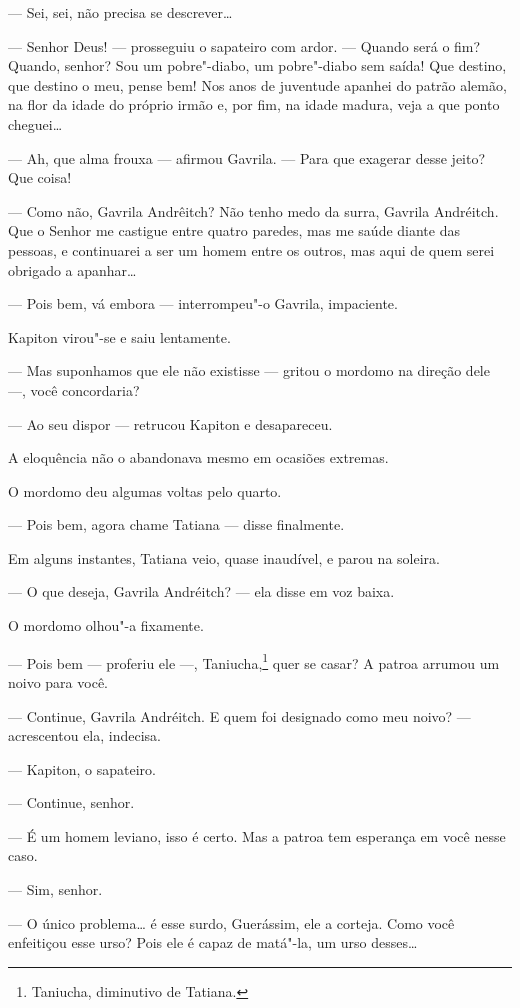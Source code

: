 --- Sei, sei, não precisa se descrever\ldots{}

--- Senhor Deus! --- prosseguiu o sapateiro com ardor. --- Quando será o
fim? Quando, senhor? Sou um pobre"-diabo, um pobre"-diabo sem saída! Que
destino, que destino o meu, pense bem! Nos anos de juventude apanhei do
patrão alemão, na flor da idade do próprio irmão e, por fim, na idade
madura, veja a que ponto cheguei\ldots{}

--- Ah, que alma frouxa --- afirmou Gavrila. --- Para que exagerar desse
jeito? Que coisa!

--- Como não, Gavrila Andrêitch? Não tenho medo da surra, Gavrila
Andréitch. Que o Senhor me castigue entre quatro paredes, mas me saúde
diante das pessoas, e continuarei a ser um homem entre os outros, mas
aqui de quem serei obrigado a apanhar\ldots{}

--- Pois bem, vá embora --- interrompeu"-o Gavrila, impaciente.

Kapiton virou"-se e saiu lentamente.

--- Mas suponhamos que ele não existisse --- gritou o mordomo na direção
dele ---, você concordaria?

--- Ao seu dispor --- retrucou Kapiton e desapareceu.

A eloquência não o abandonava mesmo em ocasiões extremas.

O mordomo deu algumas voltas pelo quarto.

--- Pois bem, agora chame Tatiana --- disse finalmente.

Em alguns instantes, Tatiana veio, quase inaudível, e parou na soleira.

--- O que deseja, Gavrila Andréitch? --- ela disse em voz baixa.

O mordomo olhou"-a fixamente.

--- Pois bem --- proferiu ele ---, Taniucha,\footnote{Taniucha,
  diminutivo de Tatiana.} quer se casar? A patroa arrumou um noivo para
você.

--- Continue, Gavrila Andréitch. E quem foi designado como meu noivo?
--- acrescentou ela, indecisa.

--- Kapiton, o sapateiro.

--- Continue, senhor.

--- É um homem leviano, isso é certo. Mas a patroa tem esperança em você
nesse caso.

--- Sim, senhor.

--- O único problema\ldots{} é esse surdo, Guerássim, ele a corteja. Como
você enfeitiçou esse urso? Pois ele é capaz de matá"-la, um urso
desses\ldots{}

